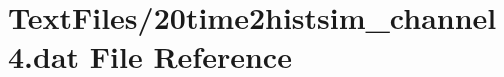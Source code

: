 \hypertarget{20time2histsim__channel4_8dat}{}\section{Text\+Files/20time2histsim\+\_\+channel4.dat File Reference}
\label{20time2histsim__channel4_8dat}

